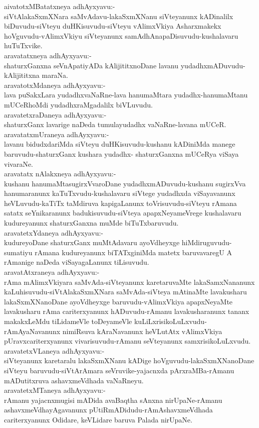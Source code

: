 \documentclass{article}
\begin{document}
aivatotxMBatatxneya adhAyxyavu:-\\
siVtAlakaSxmXNara saMvAdavu-lakaSxmXNanu siVteyanunx kADinalilx biDuvudu-siVteyu duHKisuvudu-siVteyu vAlimxVkiya Asharxmakekx hoVguvudu-vAlimxVkiyu siVteyanunx samAdhAnapaDisuvudu-kushalavaru huTuTxvike.\\
aravatatxneya adhAyxyavu:-\\
shaturxGanxna seVnApatiyADa kAlijititxnoDane lavanu yudadhxmADuvudu-kAlijititxna maraNa.\\
aravatotxMdaneya adhAyxyavu:-\\
lava puSakxLara yudadhxvaNaRne-lava hanumaMtara yudadhx-hanumaMtanu mUCeRhoMdi yudadhxraMgadalilx biVLuvudu.\\
aravatetxraDaneya adhAyxyavu:-\\
shaturxGanx lavarige naDeda tumulayudadhx vaNaRne-lavana mUCeR.\\
aravatatxmUraneya adhAyxyavu:-\\
lavanu bidudxdariMda siVteyu duHKisuvudu-kushanu kADiniMda manege baruvudu-shaturxGanx kushara yudadhx- shaturxGanxna mUCeRya viSaya vivaraNe.\\
aravatatx nAlakxneya adhAyxyavu:-\\
kushanu hanumaMtasugirxVvaroDane yudadhxmADuvudu-kushanu sugirxVva hanumaranunx kaTuTxvudu-kushalavaru siVtege yudadhxda viSayavanunx heVLuvudu-kaTiTx taMdiruva kapigaLanunx toVrisuvudu-siVteyu rAmana satatx seYnikaranunx badukisuvudu-siVteya apapxNeyameVrege kushalavaru kudureyanunx shaturxGanxna muMde biTuTxbaruvudu.\\
aravatetxYdaneya adhAyxyavu:-\\
kudureyoDane shaturxGanx muMtAdavaru ayoVdheyxge hiMdiruguvudu-sumatiyu rAmana kudureyanunx biTATxginiMda matetx baruvavaregU A rAmanige naDeda viSayagaLanunx tiLisuvudu.\\
aravatAtxraneya adhAyxyavu:-\\
rAma mAlimxVkiyara saMvAda-siVteyanunx karetaruvaMte lakaSamxNananunx kaLuhisuvudu-siVtAlakaSxmXNara saMvAda-siVteya mAtinaMte lavakusharu lakaSxmXNanoDane ayoVdheyxge baruvudu-vAlimxVkiya apapxNeyaMte lavakusharu rAma cariterxyanunx hADuvudu-rAmanu lavakusharanunx tananx makakxLeMdu tiLidameVle toDeyameVle kuLiLxrisikoLuLxvudu-rAmAyaNavanunx nimiRsuva kAraNavanunx heVLutAtx vAlimxVkiya pUravxcariterxyanunx vivarisuvudu-rAmanu seVteyanunx samxrisikoLuLxvudu.\\
aravatetxVLaneya adhAyxyavu:-\\
siVteyanunx karetaralu lakaSxmXNanu kADige hoVguvudu-lakaSxmXNanoDane siVteyu baruvudu-siVtArAmara seVruvike-yajacnxda pArxraMBa-rAmanu mADutitxruva ashavxmeVdhada vaNaRneyu.\\
aravatetxMTaneya adhAyxyavu:-\\
rAmanu yajacnxmugisi mADida avaBaqtha sAnxna nirUpaNe-rAmanu ashavxmeVdhayAgavanunx pUtiRmADidudu-rAmAshavxmeVdhada cariterxyanunx Odidare, keVLidare baruva Palada nirUpaNe.\\
\end{document}
